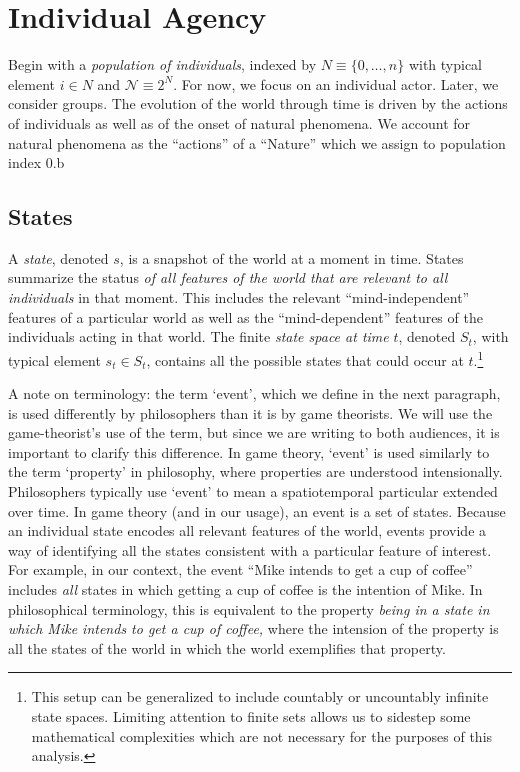 \documentclass[
11pt,
titlepage,
reqno,
]{article}%
\theoremstyle{definition}
\begin{document}
	
	\section{Individual Agency}\label{sec: Individuals}

	Begin with a \textit{population of individuals}, indexed by $N\equiv \{0,\ldots,n\}$ with typical element $i\in N$ and $\mathcal{N}\equiv 2^N$. For now, we focus on an individual actor. Later, we consider groups. The evolution of the world through time is driven by the actions of individuals as well as of the onset of natural phenomena. We account for natural phenomena as the ``actions'' of a ``Nature'' which we assign to population index 0.b 
	
	
	\subsection{States\label{sec:states}}

	A \textit{state}, denoted $s$, is a snapshot of the world at a moment in time. 
	States summarize the status \textit{of all features of the world that are relevant to all individuals} in that moment. 
	This includes the relevant ``mind-independent'' features of a particular world as well as the ``mind-dependent'' features of the individuals acting in that world. 
	The finite \textit{state space at time} $t$, denoted $S_t$, with typical element $s_t\in S_t$, contains all the possible states that could occur at $t$.\footnote
	{
		This setup can be generalized to include countably or uncountably infinite state spaces. Limiting attention to finite sets allows us to sidestep some mathematical complexities which are not necessary for the purposes of this analysis.
	} 
	
	A note on terminology: the term `event', which we define in the next paragraph, is used differently by philosophers than it is by game theorists. 
	We will use the game-theorist's use of the term, but since we are writing to both audiences, it is important to clarify this difference. 
	In game theory, `event' is used similarly to the term `property' in philosophy, where properties are understood intensionally. 
	Philosophers typically use `event' to mean a spatiotemporal particular extended over time. 
	In game theory (and in our usage), an event is a set of states. 
	Because an individual state encodes all relevant features of the world, events provide a way of identifying all the states consistent with a particular feature of interest.
	For example, in our context, the event ``Mike intends to get a cup of coffee''  includes \textit{all} states in which getting a cup of coffee is the intention of Mike. 
	In philosophical terminology, this is equivalent to the property \textit{being in a state in which Mike intends to get a cup of coffee,} where the intension of the property is all the states of the world in which the world exemplifies that property.
\end{document}
